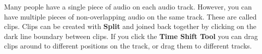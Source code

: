 \documentclass[twocolumn]{book}
\begin{document}
Many people have a single piece of audio on each audio track.  However, you can have multiple pieces of non-overlapping audio on the same track.  These are called clips.  Clips can be created with \textbf{Split} and joined back together by clicking on the dark line boundary between clips. If you click the \textbf{Time Shift Tool} you can drag clips around to different positions on the track, or drag them to different tracks.%
% 
%  
% 
%  

											

\iffalse


\fi
\end{document}
